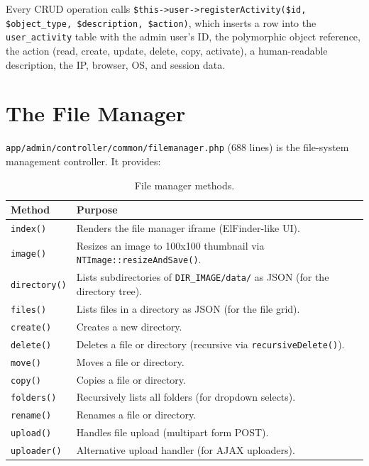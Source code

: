 \documentclass[11pt,a4paper]{article}
\begin{document}
Every CRUD operation calls
\texttt{\$this->user->registerActivity(\$id, \$object\_type,
\$description, \$action)}, which inserts a row into the
\texttt{user\_activity} table with the admin user's ID, the
polymorphic object reference, the action (read, create, update,
delete, copy, activate), a human-readable description, the IP,
browser, OS, and session data.

\section{The File Manager}\label{sec:file-manager}

\texttt{app/admin/controller/common/filemanager.php} (688 lines) is the
file-system management controller. It provides:

\begin{table}[htbp]
\centering
\caption{File manager methods.}\label{tab:filemanager}
\footnotesize\sloppy
\begin{tabularx}{\columnwidth}{llX}
\toprule
\textbf{Method} & \textbf{Purpose} \\
\midrule
\texttt{index()}        & Renders the file manager iframe (ElFinder-like UI). \\
\texttt{image()}        & Resizes an image to 100x100 thumbnail via \texttt{NTImage::resizeAndSave()}. \\
\texttt{directory()}    & Lists subdirectories of \texttt{DIR\_IMAGE/data/} as JSON (for the directory tree). \\
\texttt{files()}        & Lists files in a directory as JSON (for the file grid). \\
\texttt{create()}       & Creates a new directory. \\
\texttt{delete()}       & Deletes a file or directory (recursive via \texttt{recursiveDelete()}). \\
\texttt{move()}         & Moves a file or directory. \\
\texttt{copy()}         & Copies a file or directory. \\
\texttt{folders()}      & Recursively lists all folders (for dropdown selects). \\
\texttt{rename()}       & Renames a file or directory. \\
\texttt{upload()}       & Handles file upload (multipart form POST). \\
\texttt{uploader()}     & Alternative upload handler (for AJAX uploaders). \\
\bottomrule
\end{tabularx}
\end{table}
\end{document}
